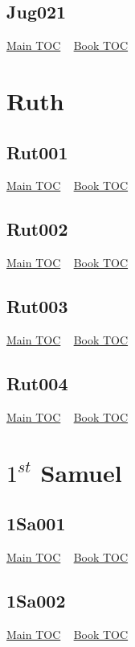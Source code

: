 \documentclass{book}
\begin{document}
  \section{Jug021}\hyperlink{toc}{Main TOC} ~ \hyperref[subsec:Jug]{Book TOC} 
  \chapter{Ruth} \label{subsec:Rut} \begin{multicols}{2} \minitoc \end{multicols}
  \section{Rut001}\hyperlink{toc}{Main TOC} ~ \hyperref[subsec:Rut]{Book TOC} 
  \section{Rut002}\hyperlink{toc}{Main TOC} ~ \hyperref[subsec:Rut]{Book TOC} 
  \section{Rut003}\hyperlink{toc}{Main TOC} ~ \hyperref[subsec:Rut]{Book TOC} 
  \section{Rut004}\hyperlink{toc}{Main TOC} ~ \hyperref[subsec:Rut]{Book TOC} 
  \chapter{$1^{st}$ Samuel} \label{subsec:1Sa} \begin{multicols}{2} \minitoc \end{multicols}
  \section{1Sa001}\hyperlink{toc}{Main TOC} ~ \hyperref[subsec:1Sa]{Book TOC} 
  \section{1Sa002}\hyperlink{toc}{Main TOC} ~ \hyperref[subsec:1Sa]{Book TOC} 
\end{document}
